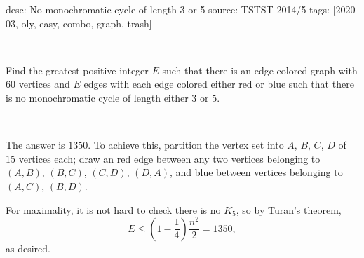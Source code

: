 desc: No monochromatic cycle of length 3 or 5
source: TSTST 2014/5
tags: [2020-03, oly, easy, combo, graph, trash]

---

Find the greatest positive integer $E$ such that there is an edge-colored graph with $60$ vertices and $E$ edges with each edge colored either red or blue such that there is no monochromatic cycle of length either $3$ or $5$.

---

The answer is $1350$. To achieve this, partition the vertex set into $A$, $B$, $C$, $D$ of $15$ vertices each; draw an red edge between any two vertices belonging to $(A,B)$, $(B,C)$, $(C,D)$, $(D,A)$, and blue between vertices belonging to $(A,C)$, $(B,D)$.

For maximality, it is not hard to check there is no $K_5$, so by Turan's theorem, \[E\le\left(1-\frac14\right)\frac{n^2}2=1350,\]
as desired.
